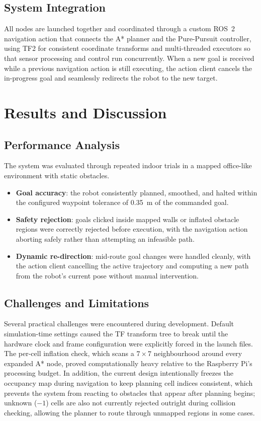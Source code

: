 \documentclass[10pt,twocolumn]{article}
\begin{document}
\subsection{System Integration}
All nodes are launched together and coordinated through a custom ROS~2 navigation action that connects the A* planner and the Pure-Pursuit controller, using TF2 for consistent coordinate transforms and multi-threaded executors so that sensor processing and control run concurrently. When a new goal is received while a previous navigation action is still executing, the action client cancels the in-progress goal and seamlessly redirects the robot to the new target.

\section{Results and Discussion}

\subsection{Performance Analysis}
The system was evaluated through repeated indoor trials in a mapped office-like environment with static obstacles.
\begin{itemize}[leftmargin=1.1em,itemsep=1pt,topsep=2pt]
\item \textbf{Goal accuracy}: the robot consistently planned, smoothed, and halted within the configured waypoint tolerance of 0.35~m of the commanded goal.
\item \textbf{Safety rejection}: goals clicked inside mapped walls or inflated obstacle regions were correctly rejected before execution, with the navigation action aborting safely rather than attempting an infeasible path.
\item \textbf{Dynamic re-direction}: mid-route goal changes were handled cleanly, with the action client cancelling the active trajectory and computing a new path from the robot's current pose without manual intervention.
\end{itemize}

\subsection{Challenges and Limitations}
Several practical challenges were encountered during development. Default simulation-time settings caused the TF transform tree to break until the hardware clock and frame configuration were explicitly forced in the launch files. The per-cell inflation check, which scans a $7\times7$ neighbourhood around every expanded A* node, proved computationally heavy relative to the Raspberry Pi's processing budget. In addition, the current design intentionally freezes the occupancy map during navigation to keep planning cell indices consistent, which prevents the system from reacting to obstacles that appear after planning begins; unknown ($-1$) cells are also not currently rejected outright during collision checking, allowing the planner to route through unmapped regions in some cases.
\end{document}
